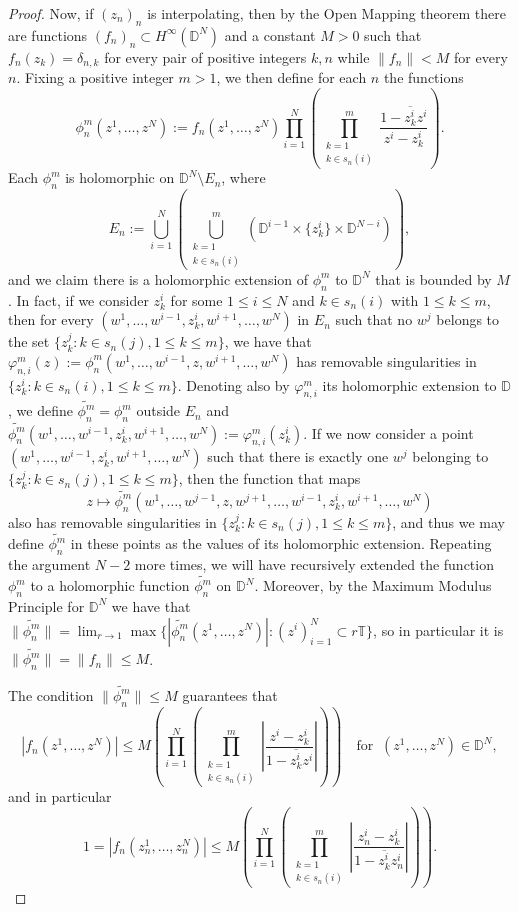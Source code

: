 \documentclass[preprint,12pt,number]{elsarticle}
\newcommand{\D}{\mathbb{D}}
\newcommand{\T}{\mathbb{T}}
\begin{document}
\begin{proof}
Now, if $(z_n)_n$ is interpolating, then by the Open Mapping theorem there are functions $(f_n)_n\subset H^\infty(\D^N)$ and a constant $M>0$ such that $f_n(z_k)=\delta_{n,k}$ for every pair of positive integers $k,n$ while $\lVert f_n \rVert<M$ for every $n$. Fixing a positive integer $m>1$, we then define for each $n$ the functions 
\[
\phi_n^m(z^1,\dots,z^N):=f_n(z^1,\dots,z^N)\prod_{i=1}^N\left(\prod_{\substack{k=1\\k\in s_n(i)}}^m \frac{1-\overline{z_k^i}z^i}{z^i-z_k^i} \right).
\] 
Each $\phi_n^m$ is holomorphic on $\D^N\setminus E_n$, where 
\[
E_n:=\bigcup_{i=1}^N\left(\bigcup_{\substack{k=1\\k\in s_n(i)}}^m\left(\D^{i-1}\times\{z_k^i\}\times \D^{N-i}\right)\right),
\] 
and we claim there is a holomorphic extension of $\phi_n^m$ to $\D^N$ that is bounded by $M$. In fact, if we consider $z_k^i$ for some $1\leq i\leq N$ and $k\in s_n(i)$ with $1\leq k\leq m$, then for every $(w^1,\dots,w^{i-1},z_k^i,w^{i+1},\dots,w^N)$ in $E_n$ such that no $w^j$ belongs to the set $\{z_k^j : k\in s_n(j), 1\leq k\leq m\}$, we have that $\varphi_{n,i}^m(z):=\phi_n^m(w^1,\dots,w^{i-1},z,w^{i+1},\dots,w^N)$ has removable singularities in $\{z_k^i : k\in s_n(i), 1\leq k\leq m\}$. Denoting also by $\varphi_{n,i}^m$ its holomorphic extension to $\D$, we define $\widetilde{\phi_n^m}=\phi_n^m$ outside $E_n$ and $\widetilde{\phi_n^m}(w^1,\dots,w^{i-1},z_k^i,w^{i+1},\dots,w^N):=\varphi_{n,i}^m(z_k^i)$. If we now consider a point $(w^1,\dots,w^{i-1},z_k^i,w^{i+1},\dots,w^N)$ such that there is exactly one $w^j$ belonging to $\{z_k^j : k\in s_n(j), 1\leq k\leq m\}$, then the function that maps 
\[
z\mapsto\widetilde{\phi_n^m}(w^1,\dots,w^{j-1},z,w^{j+1},\dots,w^{i-1},z_k^i,w^{i+1},\dots,w^N)
\] 
also has removable singularities in $\{z_k^j : k\in s_n(j), 1\leq k\leq m\}$, and thus we may define $\widetilde{\phi_n^m}$ in these points as the values of its holomorphic extension. Repeating the argument $N-2$ more times, we will have recursively extended the function $\phi_n^m$ to a holomorphic function $\widetilde{\phi_n^m}$ on $\D^N$. Moreover, by the Maximum Modulus Principle for $\D^N$ we have that $\lVert\widetilde{\phi_n^m}\rVert=\lim_{r\to 1}\max\{|\widetilde{\phi_n^m}(z^1,\dots,z^N)|: (z^i)_{i=1}^N\subset r\T\}$, so in particular it is $\lVert\widetilde{\phi_n^m}\rVert=\lVert f_n\rVert\leq M$. 
    
The condition $\lVert\widetilde{\phi_n^m}\rVert\leq M$ guarantees that 
\[
|f_n(z^1,\dots,z^N)|\leq M \left(\prod_{i=1}^N\left(\prod_{\substack{k=1\\k\in s_n(i)}}^m \left|\frac{z^i-z_k^i}{1-\overline{z_k^i}z^i}\right| \right)\right)\quad \text{for }\ (z^1,\dots, z^N)\in\D^N,
\] 
and in particular 
\[
1=|f_n(z_n^1,\dots,z_n^N)|\leq M \left(\prod_{i=1}^N\left(\prod_{\substack{k=1\\k\in s_n(i)}}^m \left|\frac{z_n^i-z_k^i}{1-\overline{z_k^i}z_n^i}\right| \right)\right).
\] 


\end{proof}
\end{document}
